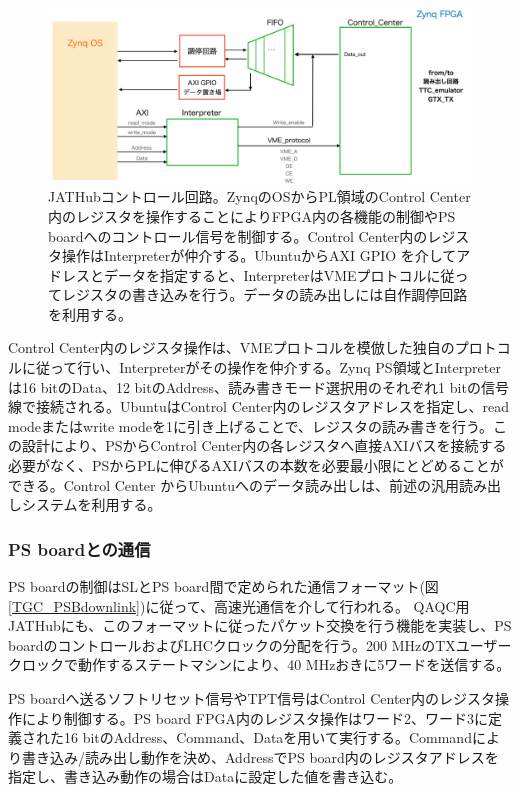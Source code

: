 \begin{figure} 
\centering
\includegraphics[width=16cm]{fig/QAQC/JATHubccenter.png}
\caption[JATHubコントロール回路]{JATHubコントロール回路。ZynqのOSからPL領域のControl Center内のレジスタを操作することによりFPGA内の各機能の制御やPS boardへのコントロール信号を制御する。Control Center内のレジスタ操作はInterpreterが仲介する。UbuntuからAXI GPIO を介してアドレスとデータを指定すると、InterpreterはVMEプロトコルに従ってレジスタの書き込みを行う。データの読み出しには自作調停回路を利用する。}
\label{JATHubccenter}
\end{figure}

Control Center内のレジスタ操作は、VMEプロトコルを模倣した独自のプロトコルに従って行い、Interpreterがその操作を仲介する。Zynq PS領域とInterpreterは16 bitのData、12 bitのAddress、読み書きモード選択用のそれぞれ1 bitの信号線で接続される。UbuntuはControl Center内のレジスタアドレスを指定し、read modeまたはwrite modeを1に引き上げることで、レジスタの読み書きを行う。この設計により、PSからControl Center内の各レジスタへ直接AXIバスを接続する必要がなく、PSからPLに伸びるAXIバスの本数を必要最小限にとどめることができる。Control Center からUbuntuへのデータ読み出しは、前述の汎用読み出しシステムを利用する。

\subsubsection{PS boardとの通信}
PS boardの制御はSLとPS board間で定められた通信フォーマット(図\ref{TGC_PSBdownlink})に従って、高速光通信を介して行われる。
QAQC用JATHubにも、このフォーマットに従ったパケット交換を行う機能を実装し、PS boardのコントロールおよびLHCクロックの分配を行う。200 MHzのTXユーザークロックで動作するステートマシンにより、40 MHzおきに5ワードを送信する。

PS boardへ送るソフトリセット信号やTPT信号はControl Center内のレジスタ操作により制御する。PS board FPGA内のレジスタ操作はワード2、ワード3に定義された16 bitのAddress、Command、Dataを用いて実行する。Commandにより書き込み/読み出し動作を決め、AddressでPS board内のレジスタアドレスを指定し、書き込み動作の場合はDataに設定した値を書き込む。


